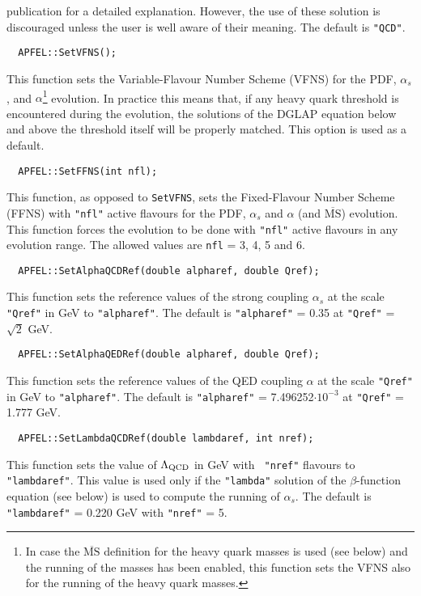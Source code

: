\documentclass[11pt,a4paper]{article}
\begin{document}
publication for a detailed explanation. However, the use of these
solution is discouraged unless the user is well aware of their
meaning. The default is {\tt "QCD"}.
\begin{lstlisting}
  APFEL::SetVFNS();
\end{lstlisting}
This function sets the Variable-Flavour Number Scheme (VFNS) for the
PDF, $\alpha_s$, and $\alpha$\footnote{In case the
  $\overline{\mbox{MS}}$ definition for the heavy quark masses is used
  (see below) and the running of the masses has been enabled, this
  function sets the VFNS also for the running of the heavy quark
  masses.} evolution. In practice this means that, if any heavy quark
threshold is encountered during the evolution, the solutions of the
DGLAP equation below and above the threshold itself will be properly
matched. This option is used as a default.
\begin{lstlisting}
  APFEL::SetFFNS(int nfl);
\end{lstlisting}
This function, as opposed to {\tt SetVFNS}, sets the Fixed-Flavour
Number Scheme (FFNS) with {\tt "nfl"} active flavours for the PDF,
$\alpha_s$ and $\alpha$ (and $\overline{\mbox{MS}}$) evolution. This
function forces the evolution to be done with {\tt "nfl"} active
flavours in any evolution range. The allowed values are {\tt nfl} = 3,
4, 5 and 6.
\begin{lstlisting}
  APFEL::SetAlphaQCDRef(double alpharef, double Qref);
\end{lstlisting}
This function sets the reference values of the strong coupling
$\alpha_s$ at the scale {\tt "Qref"} in GeV to {\tt "alpharef"}. The
default is {\tt "alpharef"} = 0.35 at {\tt "Qref"} = $\sqrt{2}$ GeV.
\begin{lstlisting}
  APFEL::SetAlphaQEDRef(double alpharef, double Qref);
\end{lstlisting}
This function sets the reference values of the QED coupling $\alpha$
at the scale {\tt "Qref"} in GeV to {\tt "alpharef"}. The default is
{\tt "alpharef"} = 7.496252$\cdot 10^{-3}$ at {\tt "Qref"} = 1.777
GeV.
\begin{lstlisting}
  APFEL::SetLambdaQCDRef(double lambdaref, int nref);
\end{lstlisting}
This function sets the value of $\Lambda_{\rm QCD}$ in GeV with {\tt
  "nref"} flavours to {\tt "lambdaref"}. This value is used only if
the {\tt "lambda"} solution of the $\beta$-function equation (see below)
is used to compute the running of $\alpha_s$. The default is {\tt
  "lambdaref"} = 0.220 GeV with {\tt "nref"} = 5.
\end{document}
